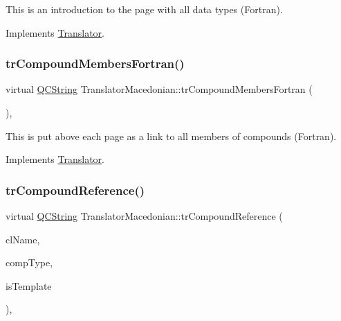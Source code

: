 This is an introduction to the page with all data types (Fortran). 

Implements \mbox{\hyperlink{class_translator}{Translator}}.

\mbox{\label{class_translator_macedonian_ac1bffd6416f8e830325425beed610671}} 
\subsubsection{\texorpdfstring{trCompoundMembersFortran()}{trCompoundMembersFortran()}}
{\footnotesize\ttfamily virtual \mbox{\hyperlink{class_q_c_string}{Q\+C\+String}} Translator\+Macedonian\+::tr\+Compound\+Members\+Fortran (\begin{DoxyParamCaption}{ }\end{DoxyParamCaption})\hspace{0.3cm}{\ttfamily [inline]}, {\ttfamily [virtual]}}

This is put above each page as a link to all members of compounds (Fortran). 

Implements \mbox{\hyperlink{class_translator}{Translator}}.

\mbox{\label{class_translator_macedonian_a2cde9ec0c21466bd3c98007eb48aa7e1}} 
\subsubsection{\texorpdfstring{trCompoundReference()}{trCompoundReference()}}
{\footnotesize\ttfamily virtual \mbox{\hyperlink{class_q_c_string}{Q\+C\+String}} Translator\+Macedonian\+::tr\+Compound\+Reference (\begin{DoxyParamCaption}\item[{const char $\ast$}]{cl\+Name,  }\item[{\mbox{\hyperlink{class_class_def_ae70cf86d35fe954a94c566fbcfc87939}{Class\+Def\+::\+Compound\+Type}}}]{comp\+Type,  }\item[{bool}]{is\+Template }\end{DoxyParamCaption})\hspace{0.3cm}{\ttfamily [inline]}, {\ttfamily [virtual]}}

